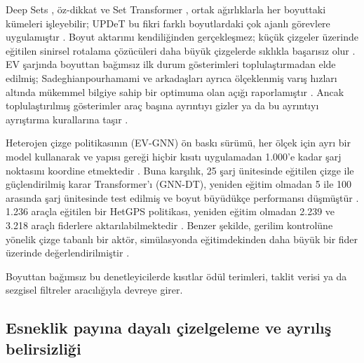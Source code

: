 Deep Sets \cite{zaheer2017deep}, öz-dikkat \cite{vaswani2017attention} ve Set Transformer \cite{lee2019set}, ortak ağırlıklarla her boyuttaki kümeleri işleyebilir; UPDeT bu fikri farklı boyutlardaki çok ajanlı görevlere uygulamıştır \cite{hu2021updet}.
Boyut aktarımı kendiliğinden gerçekleşmez; küçük çizgeler üzerinde eğitilen sinirsel rotalama çözücüleri daha büyük çizgelerde sıklıkla başarısız olur \cite{joshi2022learning}.
EV şarjında boyuttan bağımsız ilk durum gösterimleri toplulaştırmadan elde edilmiş; Sadeghianpourhamami ve arkadaşları ayrıca ölçeklenmiş varış hızları altında mükemmel bilgiye sahip bir optimuma olan açığı raporlamıştır \cite{sadeghianpourhamami2020definition}.
Ancak toplulaştırılmış gösterimler araç başına ayrıntıyı gizler ya da bu ayrıntıyı ayrıştırma kurallarına taşır \cite{zhang2022transfer,salesortiz2024efficient}.

Heterojen çizge politikasının (EV-GNN) ön baskı sürümü, her ölçek için ayrı bir model kullanarak ve yapısı gereği hiçbir kısıtı uygulamadan 1.000'e kadar şarj noktasını koordine etmektedir \cite{orfanoudakis2025scalable}.
Buna karşılık, 25 şarj ünitesinde eğitilen çizge ile güçlendirilmiş karar Transformer'ı (GNN-DT), yeniden eğitim olmadan 5 ile 100 arasında şarj ünitesinde test edilmiş ve boyut büyüdükçe performansı düşmüştür \cite{orfanoudakis2026graph}.
1.236 araçla eğitilen bir HetGPS politikası, yeniden eğitim olmadan 2.239 ve 3.218 araçlı fiderlere aktarılabilmektedir \cite{wang2026hetgps}.
Benzer şekilde, gerilim kontrolüne yönelik çizge tabanlı bir aktör, simülasyonda eğitimdekinden daha büyük bir fider üzerinde değerlendirilmiştir \cite{jin2026telemetry}.

Boyuttan bağımsız bu denetleyicilerde kısıtlar ödül terimleri, taklit verisi ya da sezgisel filtreler aracılığıyla devreye girer.

\subsection{Esneklik payına dayalı çizelgeleme ve ayrılış belirsizliği}\label{sec:rw-laxity}

